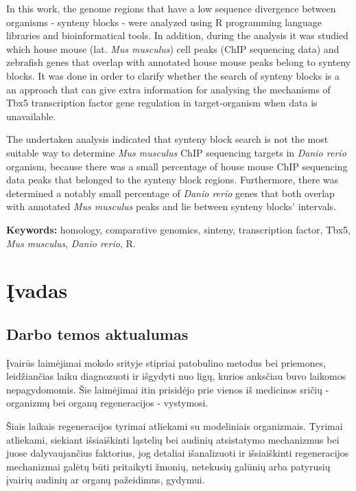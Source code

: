 \documentclass[12pt]{article}
\begin{document}
In this work, the genome regions that have a low sequence divergence between
organisms - synteny blocks - were analyzed using R programming language
libraries and bioinformatical tools. In addition, during the analysis it was
studied which house mouse (lat. \emph{Mus musculus}) cell peaks (ChIP sequencing
data) and zebrafish genes that overlap with annotated house mouse peaks belong
to synteny blocks. It was done in order to clarify whether the search of synteny
blocks is a an approach that can give extra information for analysing the
mechanisms of Tbx5 transcription factor gene regulation in target-organism when
data is unavailable.

The undertaken analysis indicated that synteny block search is not the most
suitable way to determine \emph{Mus musculus} ChIP sequencing targets in
\emph{Danio rerio} organism, because there was a small percentage of house
mouse ChIP sequencing data peaks that belonged to the synteny block regions.
Furthermore, there was determined a notably small percentage of
\emph{Danio rerio} genes that both overlap with annotated \emph{Mus musculus}
peaks and lie between synteny blocks' intervals.

\hfill \break

\textbf{Keywords:} homology, comparative genomics, sinteny, transcription
factor, Tbx5, \emph{Mus musculus}, \emph{Danio rerio}, R.

\newpage


\section{Įvadas}
\subsection*{Darbo temos aktualumas}
Įvairūs laimėjimai mokslo srityje stipriai patobulino metodus bei priemones,
leidžiančias laiku diagnozuoti ir išgydyti nuo ligų, kurios anksčiau buvo
laikomos nepagydomomis\cite{ARTICLE1}. Šie laimėjimai itin prisidėjo prie vienos
iš medicinos sričių - organizmų bei organų regeneracijos -
vystymosi\cite{ARTICLE2}.

Šiais laikais regeneracijos tyrimai atliekami su modeliniais
organizmais\cite{ORGANISMS}. Tyrimai atliekami, siekiant išsiaiškinti ląstelių
bei audinių atsistatymo mechanizmus bei juose dalyvaujančius faktorius, jog
detaliai išanalizuoti ir išsiaiškinti regeneracijos mechanizmai galėtų būti
pritaikyti žmonių, netekusių galūnių arba patyrusių įvairių audinių ar organų
pažeidimus, gydymui.
\end{document}
